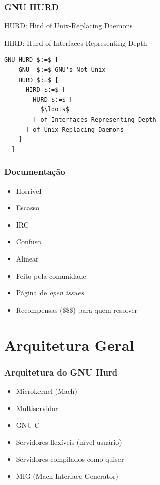 \documentclass[10pt]{beamer}
\theoremstyle{plain}
\begin{document}
\begin{frame}[fragile]
  \frametitle{GNU HURD}

  HURD\@: Hird of Unix-Replacing Daemons

  HIRD\@: Hurd of Interfaces Representing Depth

  \begin{lstlisting}[mathescape=true,showstringspaces=false,numbers=none,frame=single]
  GNU HURD $:=$ [
    GNU  $:=$ GNU's Not Unix
    HURD $:=$ [
      HIRD $:=$ [
        HURD $:=$ [
          $\ldots$
        ] of Interfaces Representing Depth
      ] of Unix-Replacing Daemons
    ]
  ]
  \end{lstlisting}

\end{frame}

\begin{frame}
  \frametitle{Documentação}

  \begin{itemize}
    \item Horrível
    \item Escasso
    \item IRC
    \item Confuso
    \item Alinear
    \item Feito pela comunidade
    \item Página de \textit{open issues}
    \item Recompensas (\$\$\$) para quem resolver
  \end{itemize}
\end{frame}

\section{Arquitetura Geral}

\begin{frame}
  \frametitle{Arquitetura do GNU Hurd}

  \begin{itemize}
    \item Microkernel (Mach)
    \item Multiservidor
    \item GNU C
    \item Servidores flexíveis (nível usuário)
    \item Servidores compilados como quiser
    \item MIG (Mach Interface Generator)
  \end{itemize}
\end{frame}
\end{document}
